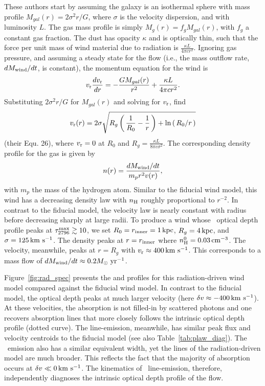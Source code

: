 \documentclass[12pt,preprint]{aastex}
\begin{document}
These authors start by assuming the galaxy is an isothermal sphere
with mass profile $M_{gal}(r) = 2\sigma^2r/G$, where $\sigma$ is the
velocity dispersion, and with luminosity $L$.  The gas mass profile is
simply $M_g(r) = f_g M_{gal}(r)$, with $f_g$ a constant gas fraction.  
The dust has opacity $\kappa$ and is optically thin, such that the force per unit mass of wind
material due to radiation is $\frac{\kappa L}{4\pi c r^2}$.
Ignoring gas pressure, and assuming a steady state for the flow (i.e.,
the mass outflow rate, $dM_{\rm wind}/dt$, is constant), the momentum
equation for the wind is 
\begin{equation}
v_{\rm r} \frac{dv_{\rm r}}{dr} = -\frac{GM_{gal}(r)}{r^2} + \frac{\kappa L}{4\pi c r^2}.
\end{equation}
Substituting $2\sigma^2 r/G$ for $M_{gal}(r)$ and solving for $v_{\rm r}$,
\citet{mqt05} find
\begin{equation}
v_{\rm r}(r) = 2\sigma \sqrt{R_g \left ( \, \frac{1}{R_0} - \frac{1}{r} \, \right )
   + \ln\left ( \, R_0/r \, \right ) }
\end{equation}
(their Equ. 26),
where $v_{\rm r} = 0$ at $R_0$ and $R_g = \frac{\kappa L}{8\pi c \sigma^2}$.
The corresponding density profile for the gas is given by
\begin{equation}
n(r) = \frac{dM_{\rm wind}/dt}{m_p r^2 v(r)}, 
\end{equation}
with $m_p$ the mass of the hydrogen atom.
Similar to the fiducial wind model, this wind has a decreasing density
law with $n_{\rm H}$ roughly proportional to $r^{-2}$. 
In contrast to the fiducial model, the velocity law is nearly
constant with radius before decreasing sharply at large radii.
To produce a wind whose \mgiia\ optical depth profile peaks at 
$\tau_{2796}^{\rm max} \gtrsim 10$, we set $R_0 = r_{\rm inner} =
1\,\rm kpc$, $R_g=4\,\rm kpc$, and $\sigma = 125 \, {\rm km~s^{-1}}$.  The density
peaks at $r=r_{\rm inner}$ where $n_{\rm H}^0 = 0.03
\, {\rm cm^{-3}}$.  The velocity, meanwhile, peaks at $r=R_g$ with $v_{\rm r}
\approx 400 \, {\rm km~s^{-1}}$.  This corresponds to a mass flow of
$dM_{\rm wind}/dt \approx 0.2 M_\odot\; \rm yr^{-1}$.  

Figure~\ref{fig:rad_spec} presents the  and 
profiles for this radiation-driven wind model compared against the
fiducial wind model.
In contrast to the fiducial model, 
the optical depth peaks at much larger velocity (here $\delta v
\approx -400 \, {\rm km~s^{-1}}$).  At these velocities, the absorption is not
filled-in by scattered photons and one recovers absorption lines
that more closely follows the intrinsic optical depth profile (dotted
curve). The  line-emission, meanwhile, has
similar peak flux and velocity centroids to the fiducial model (see also
Table~\ref{tab:plaw_diag}).  The \feiis\ emission also has a similar
equivalent width, yet the lines of the radiation-driven model are much
broader. This reflects the fact that the majority of absorption
occurs at $\delta v \ll 0 \, {\rm km~s^{-1}}$.
The kinematics of \feiis\ line-emission, therefore, independently
diagnoses the intrinsic optical depth profile of the flow.
\end{document}
